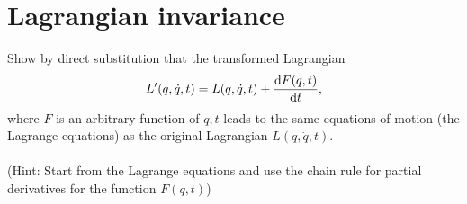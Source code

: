 \documentclass{article}
\begin{document}
    \section{Lagrangian invariance}
    Show by direct substitution that the transformed Lagrangian
    \begin{equation*}
        L'(q, \dot q, t) = L(q, \dot q, t) + \dv{F(q, t)}{t},
    \end{equation*}
    where $F$ is an arbitrary function of $q, t$ leads to the same equations of motion (the Lagrange equations) as the original Lagrangian $L(q, \dot q, t)$.\\  \\
    (Hint: Start from the Lagrange equations and use the chain rule for partial derivatives for the function $F(q, t)$)
\end{document}
